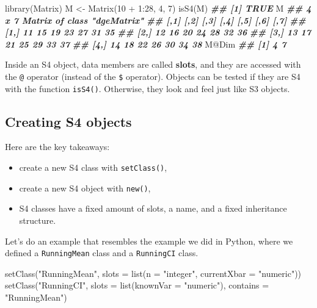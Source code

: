 \documentclass[
  12pt,
  krantz2]{krantz}
\makeatletter
\newenvironment{Shaded}{\begin{snugshade}}{\end{snugshade}}
\newcommand{\AttributeTok}[1]{\textcolor[rgb]{0.61,0.61,0.61}{#1}}
\newcommand{\DecValTok}[1]{\textcolor[rgb]{0.06,0.06,0.06}{#1}}
\newcommand{\DocumentationTok}[1]{\textcolor[rgb]{0.37,0.37,0.37}{\textbf{\textit{#1}}}}
\newcommand{\FunctionTok}[1]{\textcolor[rgb]{0,0,0}{#1}}
\newcommand{\NormalTok}[1]{#1}
\newcommand{\OtherTok}[1]{\textcolor[rgb]{0.37,0.37,0.37}{#1}}
\newcommand{\SpecialCharTok}[1]{\textcolor[rgb]{0,0,0}{#1}}
\newcommand{\StringTok}[1]{\textcolor[rgb]{0.5,0.5,0.5}{#1}}
\providecommand{\tightlist}{%
  \setlength{\itemsep}{0pt}\setlength{\parskip}{0pt}}
\newenvironment{kframe}{%
\medskip{}
\setlength{\fboxsep}{.8em}
 \def\at@end@of@kframe{}%
 \ifinner\ifhmode%
  \def\at@end@of@kframe{\end{minipage}}%
  \begin{minipage}{\columnwidth}%
 \fi\fi%
 \def\FrameCommand##1{\hskip\@totalleftmargin \hskip-\fboxsep
 \colorbox{shadecolor}{##1}\hskip-\fboxsep
     \hskip-\linewidth \hskip-\@totalleftmargin \hskip\columnwidth}%
 \MakeFramed {\advance\hsize-\width
   \@totalleftmargin\z@ \linewidth\hsize
   \@setminipage}}%
 {\par\unskip\endMakeFramed%
 \at@end@of@kframe}
\renewenvironment{Shaded}{\begin{kframe}}{\end{kframe}}
\makeatother
\begin{document}
\begin{Shaded}
\begin{Highlighting}[]
\FunctionTok{library}\NormalTok{(Matrix)}
\NormalTok{M }\OtherTok{\textless{}{-}} \FunctionTok{Matrix}\NormalTok{(}\DecValTok{10} \SpecialCharTok{+} \DecValTok{1}\SpecialCharTok{:}\DecValTok{28}\NormalTok{, }\DecValTok{4}\NormalTok{, }\DecValTok{7}\NormalTok{)}
\FunctionTok{isS4}\NormalTok{(M)}
\DocumentationTok{\#\# [1] TRUE}
\NormalTok{M}
\DocumentationTok{\#\# 4 x 7 Matrix of class "dgeMatrix"}
\DocumentationTok{\#\#      [,1] [,2] [,3] [,4] [,5] [,6] [,7]}
\DocumentationTok{\#\# [1,]   11   15   19   23   27   31   35}
\DocumentationTok{\#\# [2,]   12   16   20   24   28   32   36}
\DocumentationTok{\#\# [3,]   13   17   21   25   29   33   37}
\DocumentationTok{\#\# [4,]   14   18   22   26   30   34   38}
\NormalTok{M}\SpecialCharTok{@}\NormalTok{Dim}
\DocumentationTok{\#\# [1] 4 7}
\end{Highlighting}
\end{Shaded}

Inside an S4 object, data members are called \textbf{slots}, and they are accessed with the \texttt{@} operator (instead of the \texttt{\$} operator). Objects can be tested if they are S4 with the function \texttt{isS4()}. Otherwise, they look and feel just like S3 objects.

\hypertarget{creating-s4-objects}{%
\subsection{Creating S4 objects}\label{creating-s4-objects}}

Here are the key takeaways:

\begin{itemize}
\tightlist
\item
  create a new S4 class with \texttt{setClass()},
\item
  create a new S4 object with \texttt{new()},
\item
  S4 classes have a fixed amount of slots, a name, and a fixed inheritance structure.
\end{itemize}

Let's do an example that resembles the example we did in Python, where we defined a \texttt{RunningMean} class and a \texttt{RunningCI} class.

\begin{Shaded}
\begin{Highlighting}[]
\FunctionTok{setClass}\NormalTok{(}\StringTok{"RunningMean"}\NormalTok{,}
         \AttributeTok{slots =} \FunctionTok{list}\NormalTok{(}\AttributeTok{n =} \StringTok{"integer"}\NormalTok{, }
                      \AttributeTok{currentXbar =} \StringTok{"numeric"}\NormalTok{))}
\FunctionTok{setClass}\NormalTok{(}\StringTok{"RunningCI"}\NormalTok{,}
         \AttributeTok{slots =} \FunctionTok{list}\NormalTok{(}\AttributeTok{knownVar =} \StringTok{"numeric"}\NormalTok{),}
         \AttributeTok{contains =} \StringTok{"RunningMean"}\NormalTok{)}
\end{Highlighting}
\end{Shaded}
\end{document}
